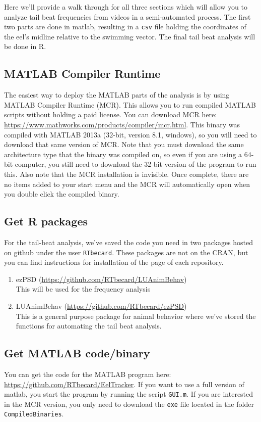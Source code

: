 \documentclass[11pt]{report}
\begin{document}
Here we'll provide a walk through for all three sections which will allow you to analyze tail beat frequencies from videos in a semi-automated process.  The first two parts are done in matlab, resulting in a \texttt{csv} file holding the coordinates of the eel's midline relative to the swimming vector.  The final tail beat analysis will be done in R.

\subsection{MATLAB Compiler Runtime}

The easiest way to deploy the MATLAB parts of the analysis is by using MATLAB Compiler Runtime (MCR).
This allows you to run compiled MATLAB scripts without holding a paid license. You can download MCR here: \url{https://www.mathworks.com/products/compiler/mcr.html}.
This binary was compiled with MATLAB 2013a (32-bit, version 8.1, windows), so you will need to download that same version of MCR.
Note that you must download the same architecture type that the binary was compiled on, so even if you are using a 64-bit computer, you still need to download the 32-bit version of the program to run this.
Also note that the MCR installation is invisible.
Once complete, there are no items added to your start menu and the MCR will automatically open when you double click the compiled binary.

\subsection{Get R packages}
For the tail-beat analysis, we've saved the code you need in two packages hosted on github under the user \texttt{RTbecard}.
These packages are not on the CRAN, but you can find instructions for installation of the page of each repository.

\begin{enumerate}
	\item ezPSD (\url{https://github.com/RTbecard/LUAnimBehav}) \\
	      This will be used for the frequency analysis
	\item LUAnimBehav (\url{https://github.com/RTbecard/ezPSD}) \\
	      This is a general purpose package for animal behavior where we've stored the functions for automating the tail beat analysis.
\end{enumerate}

\subsection{Get MATLAB code/binary}
You can get the code for the MATLAB program here: \url{https://github.com/RTbecard/EelTracker}.
If you want to use a full version of matlab, you start the program by running the script \texttt{GUI.m}.
If you are interested in the MCR version, you only need to download the \texttt{exe} file located in the folder \texttt{CompiledBinaries}.
\end{document}
